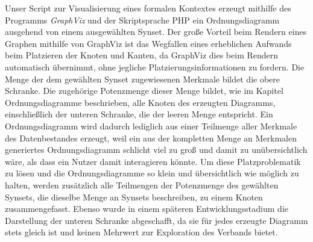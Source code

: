 \documentclass[pagesize,paper=A4,DIV=calc,fontsize=12pt,draft=false]{scrreprt}
\begin{document}
Unser Script zur Visualisierung eines formalen Kontextes erzeugt mithilfe des Programms \emph{GraphViz} und der Skriptsprache PHP ein Ordnungsdiagramm ausgehend von einem ausgewählten Synset. 
Der große Vorteil beim Rendern eines Graphen mithilfe von GraphViz ist das Wegfallen eines erheblichen Aufwands beim Platzieren der Knoten und Kanten, da GraphViz dies beim Rendern automatisch übernimmt, ohne jegliche Platzierungsinformationen zu fordern. 
Die Menge der dem gewählten Synset zugewiesenen Merkmale bildet die obere Schranke. 
Die zugehörige Potenzmenge dieser Menge bildet, wie im Kapitel Ordnungsdiagramme beschrieben, alle Knoten des erzeugten Diagramms, einschließlich der unteren Schranke, die der leeren Menge entspricht. 
Ein Ordnungsdiagramm wird dadurch lediglich aus einer Teilmenge aller Merkmale des Datenbestandes erzeugt, weil ein aus der kompletten Menge an Merkmalen generiertes Ordnungsdiagramm schlicht viel zu groß und damit zu unübersichtlich wäre, als dass ein Nutzer damit interagieren könnte. 
Um diese Platzproblematik zu lösen und die Ordnungsdiagramme so klein und übersichtlich wie möglich zu halten, werden zusätzlich alle Teilmengen der Potenzmenge des gewählten Synsets, die dieselbe Menge an Synsets beschreiben, zu einem Knoten zusammengefasst. 
Ebenso wurde in einem späteren Entwicklungsstadium die Darstellung der unteren Schranke abgeschafft, da sie für jedes erzeugte Diagramm stets gleich ist und keinen Mehrwert zur Exploration des Verbands bietet.
\end{document}
